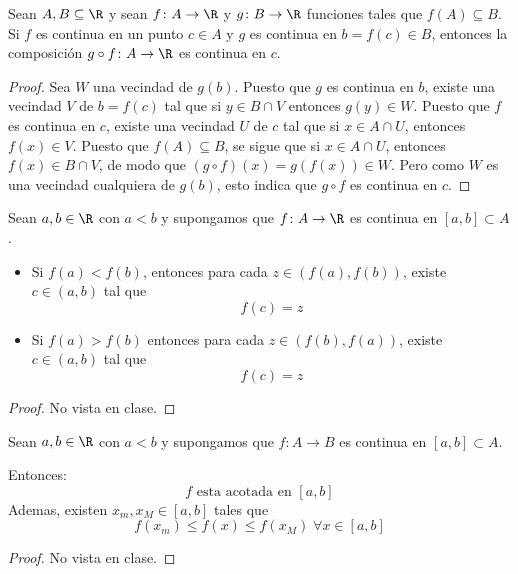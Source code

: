 \begin{theorem}
	Sean \(A,B \subseteq \R \) y sean \(f \colon A \to \R\) y \(g \colon B \to \R\) funciones tales que \(f(A) \subseteq B\). Si \(f \) es continua en un punto \(c \in A \) y \(g \) es continua en \(b = f(c ) \in B\), entonces la composición \(g \circ f\colon A \to \R\) es continua en \(c \).
\end{theorem}
\begin{proof}
	Sea \(W \) una vecindad de \(g(b )\). Puesto que \(g \) es continua en \(b \), existe una vecindad \(V \) de \(b = f(c )\) tal que si \(y \in B \cap V\) entonces \(g(y) \in W \). Puesto que \(f \) es continua en \(c \), existe una vecindad \(U \) de \(c \) tal que si \(x \in A \cap U\), entonces \(f(x) \in V\). Puesto que \(f(A) \subseteq B\), se sigue que si \(x \in A \cap U \), entonces \(f(x) \in B \cap V \), de modo que \((g \circ  f)(x) = g(f(x)) \in W\). Pero como \(W \) es una vecindad cualquiera de \(g(b )\), esto indica que \(g \circ  f\) es continua en \(c \).
\end{proof}
\begin{theorem}
	Sean \(a,b \in \R \) con \(a < b \) y supongamos que \(f\colon A \to \R \) es continua en \([a,b] \subset A \).

	\begin{itemize}
		\item Si \(f(a) < f(b )\), entonces para cada \(z \in (f(a), f(b ))\), existe \(c \in (a,b )\) tal que
		      \[
			      f(c) = z
		      \]
		\item Si \(f(a) > f(b)\) entonces para cada \(z \in (f(b), f(a ))\), existe \(c \in (a,b )\) tal que
		      \[
			      f(c) = z
		      \]
	\end{itemize}
\end{theorem}
\begin{proof}
	No vista en clase.
\end{proof}

\begin{theorem}
	Sean \(a,b \in \R \) con \(a < b \) y supongamos que \(f \colon A \to B \) es continua en \([a,b] \subset A \).

	Entonces:
	\[
		f \text{ esta acotada en }[a,b]
	\]
	Ademas, existen \(x_m, x_M \in [a,b ]\) tales que
	\[
		f(x_m) \leq f(x) \leq f(x_M) \; \forall x \in [a,b ]
	\]
\end{theorem}
\begin{proof}
	No vista en clase.
\end{proof}

